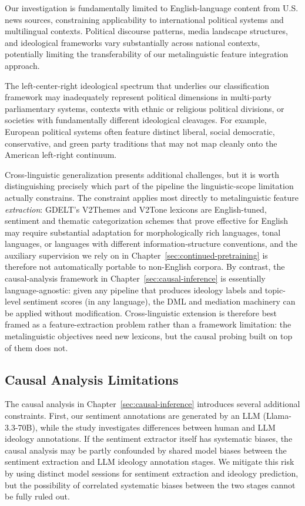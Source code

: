 Our investigation is fundamentally limited to English-language content from U.S. news sources, constraining applicability to international political systems and multilingual contexts. Political discourse patterns, media landscape structures, and ideological frameworks vary substantially across national contexts, potentially limiting the transferability of our metalinguistic feature integration approach.

The left-center-right ideological spectrum that underlies our classification framework may inadequately represent political dimensions in multi-party parliamentary systems, contexts with ethnic or religious political divisions, or societies with fundamentally different ideological cleavages. For example, European political systems often feature distinct liberal, social democratic, conservative, and green party traditions that may not map cleanly onto the American left-right continuum.

Cross-linguistic generalization presents additional challenges, but it is worth distinguishing precisely which part of the pipeline the linguistic-scope limitation actually constrains. The constraint applies most directly to metalinguistic feature \emph{extraction}: GDELT's V2Themes and V2Tone lexicons are English-tuned, sentiment and thematic categorization schemes that prove effective for English may require substantial adaptation for morphologically rich languages, tonal languages, or languages with different information-structure conventions, and the auxiliary supervision we rely on in Chapter~\ref{sec:continued-pretraining} is therefore not automatically portable to non-English corpora. By contrast, the causal-analysis framework in Chapter~\ref{sec:causal-inference} is essentially language-agnostic: given any pipeline that produces ideology labels and topic-level sentiment scores (in any language), the DML and mediation machinery can be applied without modification. Cross-linguistic extension is therefore best framed as a feature-extraction problem rather than a framework limitation: the metalinguistic objectives need new lexicons, but the causal probing built on top of them does not.

\subsection{Causal Analysis Limitations}

The causal analysis in Chapter~\ref{sec:causal-inference} introduces several additional constraints. First, our sentiment annotations are generated by an LLM (Llama-3.3-70B), while the study investigates differences between human and LLM ideology annotations. If the sentiment extractor itself has systematic biases, the causal analysis may be partly confounded by shared model biases between the sentiment extraction and LLM ideology annotation stages. We mitigate this risk by using distinct model sessions for sentiment extraction and ideology prediction, but the possibility of correlated systematic biases between the two stages cannot be fully ruled out.


